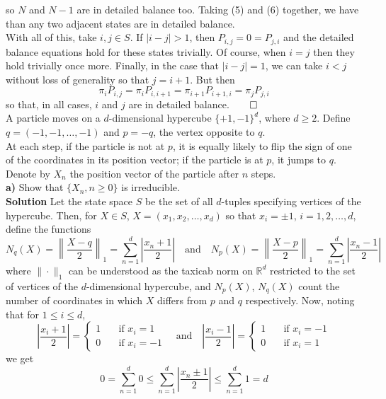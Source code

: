 \documentclass[11pt, letterpaper]{article}
\newcommand{\mbb}[1]{\mathbb{#1}}
\begin{document}
    so $N$ and $N-1$ are in detailed balance too. Taking (5) and (6) together, we have than any two adjacent states are in detailed balance.\\[10pt]
    With all of this, take $i,j\in S$. If $|i-j|>1$, then $P_{i,j}=0=P_{j,i}$ and the detailed balance equations hold for these states trivially.
    Of course, when $i=j$ then they hold trivially once more. Finally, in the case that $|i-j|=1$, we can take $i<j$ without loss of generality so that $j=i+1$. But then
    \[\pi_iP_{i,j}=\pi_iP_{i,i+1}=\pi_{i+1}P_{i+1,i}=\pi_jP_{j,i}\]
    so that, in all cases, $i$ and $j$ are in detailed balance.\hfill{$\qed$}\\[10pt]
     A particle moves on a $d$-dimensional hypercube $\{+1,-1\}^d$, where $d\geq 2$. Define $q=(-1,-1,\dots,-1)$ and $p=-q$, the vertex opposite to $q$.\\[10pt]
    At each step, if the particle is not at $p$, it is equally likely to flip the sign of one of the coordinates in its position vector; if the particle is at $p$,
    it jumps to $q$. Denote by $X_n$ the position vector of the particle after $n$ steps.\\[10pt]
    {\bf a)} Show that $\{X_n,n\geq 0\}$ is irreducible.\\[10pt]
    {\bf Solution} Let the state space $S$ be the set of all $d$-tuples specifying vertices of the hypercube. Then, for $X\in S$, $X=(x_1,x_2,\dots,x_d)$ so that $x_i=\pm 1$, $i=1,2,\dots,d$, define the functions
    \[N_q(X)=\left\|\frac{X-q}{2}\right\|_1=\sum_{n=1}^d\left|\frac{x_n+1}{2}\right|\quad\text{and}\quad N_p(X)=\left\|\frac{X-p}{2}\right\|_1=\sum_{n=1}^d\left|\frac{x_n-1}{2}\right|\]
    where $\|\cdot\|_1$ can be understood as the taxicab norm on $\mbb{R}^d$ restricted to the set of vertices of the $d$-dimensional hypercube, and $N_p(X)$, $N_q(X)$ count the number of coordinates in which $X$ differs from $p$ and $q$ respectively.
    Now, noting that for $1\leq i\leq d$,
    \[\left|\frac{x_i+1}{2}\right|=\begin{cases}
        1\quad&\text{if $x_i=1$}\\
        0\quad&\text{if $x_i=-1$}
    \end{cases}\quad\text{and}\quad \left|\frac{x_i-1}{2}\right|=\begin{cases}
        1\quad&\text{if $x_i=-1$}\\
        0\quad&\text{if $x_i=1$}
    \end{cases}\]
    we get
    \[0=\sum_{n=1}^d0\leq\sum_{n=1}^d\left|\frac{x_n\pm1}{2}\right|\leq\sum_{n=1}^d1=d\]
\end{document}
